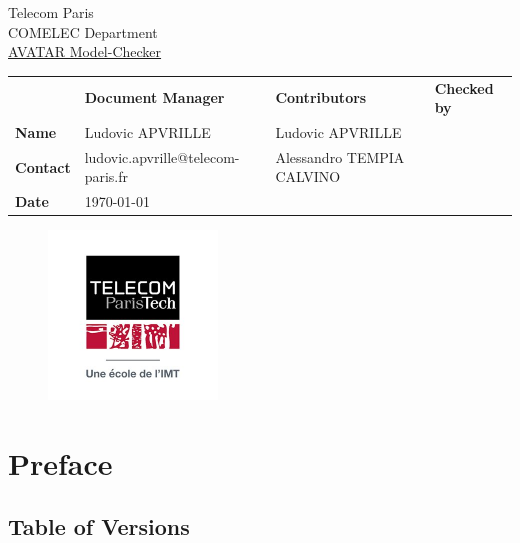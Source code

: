 \documentclass[12pt]{article}
\begin{document}
\sloppy 

\begin{center}
\Large Telecom Paris \\
\Large COMELEC Department \\
\vspace{20 pt}
\underline{\Huge AVATAR Model-Checker}
\end{center}

\begin{table}[H]
\large
\centering
\begin{adjustbox}{width=\textwidth}
\begin{tabular}{ |p{1.6cm}|p{6.0cm}|p{4.4cm}|p{4.2cm}| }
\hhline{----}
 & \textbf{Document Manager} & \textbf{Contributors}  & \textbf{Checked by}  \\ 
\hhline{----}
\textbf{Name}   & Ludovic APVRILLE & Ludovic APVRILLE &
\multirow{2}{*}{%
} \\
\hhline{--~~}
\textbf{Contact} & ludovic.apvrille@telecom-paris.fr & Alessandro TEMPIA CALVINO & \\ 
\hhline{--~~}
\textbf{Date} & \today &  &  \\ 
\hline
\end{tabular}
\end{adjustbox}
\end{table}

\begin{figure}[!h]
\centering
\includegraphics[width=0.4\textwidth]{images/image1.png}
\end{figure}

\newpage
\tableofcontents


\newpage
\section{Preface}

\subsection{Table of Versions}
\end{document}
